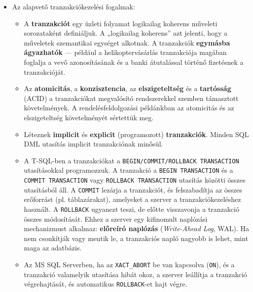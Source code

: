 \documentclass[
  magyar,
]{article}
\begin{document}
\begin{itemize}
\item
  Az alapvető tranzakciókezelési fogalmak:

  \begin{itemize}
  \item
    A \textbf{tranzakciót} egy üzleti folyamat logikailag koherens
    műveleti sorozataként definiáljuk. A „logikailag koherens'' azt
    jelenti, hogy a műveletek szemantikai egységet alkotnak. A
    tranzakciók \textbf{egymásba ágyazhatók} --- például a
    helikoptervásárlás tranzakciója magában foglalja a vevő
    azonosításának és a banki átutalással történő fizetésnek a
    tranzakcióját.
  \item
    Az \textbf{atomicitás}, a \textbf{konzisztencia}, az
    \textbf{elszigeteltség} és a \textbf{tartósság} (ACID) a
    tranzakciókat megvalósító rendszerekkel szemben támasztott
    követelmények. A rendelésfeldolgozási példánkban az atomicitás és az
    elszigeteltség követelményét sértettük meg.
  \item
    Léteznek \textbf{implicit} és \textbf{explicit} (programozott)
    \textbf{tranzakciók}. Minden SQL DML utasítás implicit tranzakciónak
    minősül.
  \item
    A T-SQL-ben a tranzakciókat a
    \texttt{BEGIN/COMMIT/ROLLBACK\ TRANSACTION} utasításokkal
    programozzuk. A tranzakció a \texttt{BEGIN\ TRANSACTION} és a
    \texttt{COMMIT\ TRANSACTION} vagy \texttt{ROLLBACK\ TRANSACTION}
    utasítás közötti összes utasításból áll. A \texttt{COMMIT} lezárja a
    tranzakciót, és felszabadítja az összes erőforrást (pl.
    táblazárakat), amelyeket a szerver a tranzakciókezeléshez használt.
    A \texttt{ROLLBACK} ugyanezt teszi, de előtte visszavonja a
    tranzakció összes módosítását. Ehhez a szerver egy kifinomult
    naplózási mechanizmust alkalmaz: \textbf{előreíró naplózás}
    (\emph{Write-Ahead Log}, WAL). Ha nem csonkítják vagy mentik le, a
    tranzakciós napló nagyobb is lehet, mint maga az adatbázis.
  \item
    Az MS SQL Serverben, ha az \texttt{XACT\_ABORT} be van kapcsolva
    (\texttt{ON}), és a tranzakció valamelyik utasítása hibát okoz, a
    szerver leállítja a tranzakció végrehajtását, és automatikus
    \texttt{ROLLBACK}-et hajt végre.
  \end{itemize}
\end{itemize}
\end{document}
